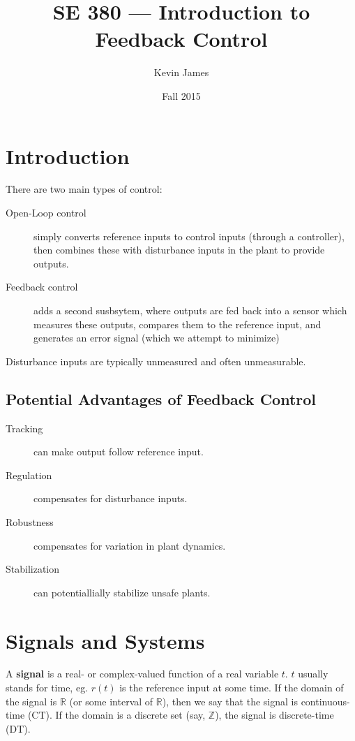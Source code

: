 \documentclass[12pt]{article}
\begin{document}
\title{SE 380 --- Introduction to Feedback Control}
\author{Kevin James}
\date{\vspace{-2ex}Fall 2015}
\maketitle\HRule

\tableofcontents
\newpage

\section{Introduction}
There are two main types of control:
\begin{description}
\item[Open-Loop control] simply converts reference inputs to control inputs (through a controller), then combines these with disturbance inputs in the plant to provide outputs.
\item[Feedback control] adds a second susbsytem, where outputs are fed back into a sensor which measures these outputs, compares them to the reference input, and generates an error signal (which we attempt to minimize)
\end{description}

Disturbance inputs are typically unmeasured and often unmeasurable.

\subsection{Potential Advantages of Feedback Control}
\begin{description}
\item[Tracking] can make output follow reference input.
\item[Regulation] compensates for disturbance inputs.
\item[Robustness] compensates for variation in plant dynamics.
\item[Stabilization] can potentiallially stabilize unsafe plants.
\end{description}

\section{Signals and Systems}
A {\bf signal} is a real- or complex-valued function of a real variable $t$. $t$ usually stands for time, eg. $r(t)$ is the reference input at some time. If the domain of the signal is $\mathbb{R}$ (or some interval of $\mathbb{R}$), then we say that the signal is continuous-time (CT). If the domain is a discrete set (say, $\mathbb{Z}$), the signal is discrete-time (DT).
\end{document}
